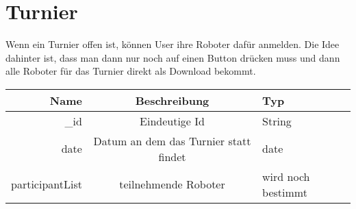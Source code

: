 \documentclass[Info_VK_Website_Dokumentation.tex]{subfiles}
\begin{document}
\section{Turnier} 

Wenn ein Turnier offen ist, können User ihre Roboter dafür anmelden. Die Idee dahinter ist, dass man dann nur noch auf einen Button drücken muss und dann alle Roboter für das Turnier direkt als Download bekommt.


\begin{table}[H]
\centering
\begin{tabular}{ r | c | l}
\textbf{Name} & \textbf{Beschreibung} & \textbf{Typ} \\
\hline
\hline
\_id       & Eindeutige Id & String \\
\hline
date  & Datum an dem das Turnier statt findet &  date \\
\hline
participantList & teilnehmende Roboter  & wird noch bestimmt \\ 
\end{tabular}
\end{table} 
\end{document}
